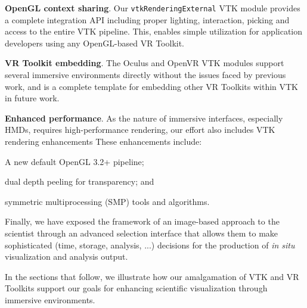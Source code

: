 \textbf{OpenGL context sharing}.
Our \texttt{vtkRenderingExternal} VTK module provides a complete integration API
including proper lighting, interaction, picking and access to the entire
VTK pipeline.
This, enables simple utilization for application developers using
any OpenGL-based VR Toolkit.

\textbf{VR Toolkit embedding}.
The Oculus and OpenVR VTK modules support several immersive environments directly
without the issues faced by previous work, and is a complete template
for embedding other VR Toolkits within VTK in future work.

\textbf{Enhanced performance}.
As the nature of immersive interfaces, especially HMDs, requires
high-performance rendering, our effort also includes VTK rendering enhancements
These enhancements include:

\begin{compactitem}
\item A new default OpenGL 3.2+ pipeline;
\item dual depth peeling for transparency; and 
\item symmetric multiprocessing (SMP) tools and algorithms.
\end{compactitem}

Finally, we have exposed the framework of an image-based approach to the scientist through an advanced selection interface that allows them to make sophisticated (time, storage, analysis, ...) decisions for the production of \textit{in situ} visualization and analysis output.

In the sections that follow, we illustrate how our amalgamation of VTK and VR Toolkits support our goals for enhancing scientific visualization through immersive environments.

